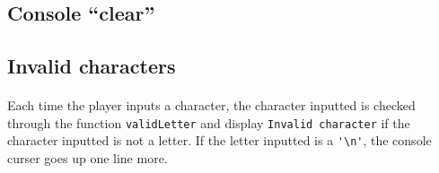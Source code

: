 \documentclass{report}
\begin{document}
\subsection{Console ``clear''}

\paragraph{}

\subsection{Invalid characters}

\paragraph{} Each time the player inputs a character, the character inputted is
checked through the function \lstinline[style=prog]|validLetter| and display
\texttt{Invalid character} if the character inputted is not a letter. If the
letter inputted is a \lstinline[style=prog]|'\n'|, the console curser goes up
one line more.
\end{document}
